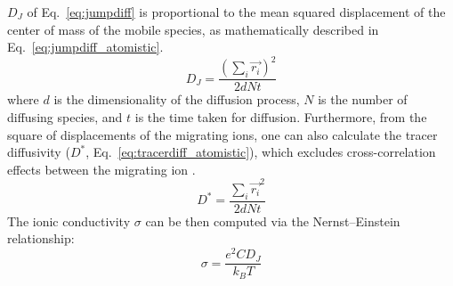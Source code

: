 \documentclass[a4paper,fleqn]{cas-dc}
\begin{document}
$D_J$ of Eq.~\ref{eq:jumpdiff} is proportional to the mean squared displacement of the center of mass of the mobile species, as mathematically described in Eq.~\ref{eq:jumpdiff_atomistic}.
%
\begin{equation}
\label{eq:jumpdiff_atomistic}
D_J = \frac{\left(\sum_i \vec{r_i}\right)^2}{2dNt}
\end{equation}
%
where $d$ is the dimensionality of the diffusion process, $N$ is the number of diffusing species, and $t$ is the time taken for diffusion. Furthermore, from the square of displacements of the migrating ions, one can also calculate the tracer diffusivity ($D^{*}$, Eq.~\ref{eq:tracerdiff_atomistic}), which excludes cross-correlation effects between the migrating ion \cite{van_der_ven_rechargeable_2020}.
%
\begin{equation}
\label{eq:tracerdiff_atomistic}
D^{*} = \frac{\sum_i \vec{r_i}^2}{2dNt} 
\end{equation}
%
The ionic conductivity $\sigma$ can be then computed via the Nernst–Einstein relationship:
%
\begin{equation}
    \label{eq:conduct}
    \sigma=\frac{e^2CD_J}{k_BT}
\end{equation}
%
\end{document}
